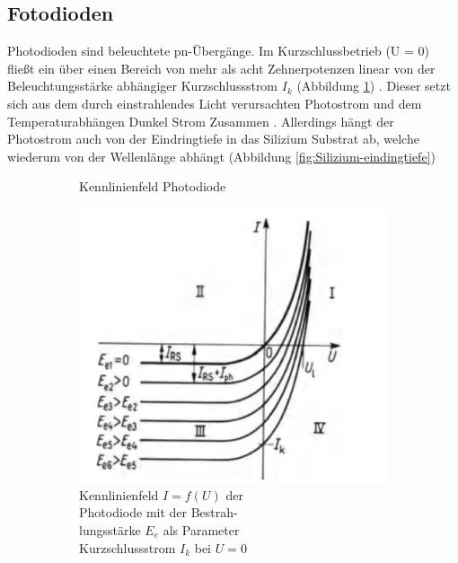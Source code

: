 
\subsection{Fotodioden}
Photodioden sind beleuchtete pn-Übergänge. Im Kurzschlussbetrieb (U = 0) fließt ein über einen Bereich von mehr als acht Zehnerpotenzen linear von der Beleuchtungsstärke abhängiger Kurzschlussstrom $I_k$ (Abbildung \ref{fig:PhotodiodeKennline})
\cite{Aktive_Bauelemente}.
Dieser setzt sich aus dem durch einstrahlendes Licht verursachten Photostrom und dem Temperaturabhängen Dunkel Strom Zusammen \cite{Halbleiterelektronik}.
Allerdings hängt der Photostrom auch von der Eindringtiefe in das Silizium Substrat ab, welche wiederum von der Wellenlänge abhängt (Abbildung  \ref{fig:Silizium-eindingtiefe}) \cite{osiopto_electronics}

\begin{figure}[H]
  \begin{subfigure}[b]{0.4\textwidth}
  \caption{Kennlinienfeld Photodiode}
    \includegraphics[width=\textwidth]{img/Photodiode-Kennline.png}
    \caption*{Kennlinienfeld $I=f(U)$ der \\Photodiode mit der Bestrah-\\lungsstärke $E_e$ als Parameter\\Kurzschlussstrom $I_k$ bei $U=0$}
    \label{fig:PhotodiodeKennline}
  \end{subfigure}
  \begin{subfigure}[b]{0.6\textwidth}

\end{subfigure}
\end{figure}
